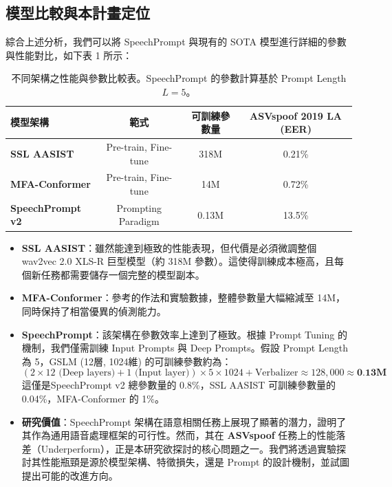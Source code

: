 \subsection{模型比較與本計畫定位}

綜合上述分析，我們可以將 SpeechPrompt 與現有的 SOTA 模型進行詳細的參數與性能對比，如下表 1 所示：

\begin{table}[H]
\centering
\caption{不同架構之性能與參數比較表。SpeechPrompt 的參數計算基於 Prompt Length $L=5$。}
\label{tab:model_comparison}
\begin{tabular}{lccc}
\toprule
\textbf{模型架構} & \textbf{範式 } & \textbf{可訓練參數量} & \textbf{ASVspoof 2019 LA (EER)} \\
\midrule
\textbf{SSL AASIST} & Pre-train, Fine-tune & 318M & 0.21\% \\
\textbf{MFA-Conformer} & Pre-train, Fine-tune & 14M & 0.72\% \\
\textbf{SpeechPrompt v2} & Prompting Paradigm & 0.13M & 13.5\% \\
\bottomrule
\end{tabular}
\end{table}

\begin{itemize}
    \item \textbf{SSL AASIST}：雖然能達到極致的性能表現，但代價是必須微調整個 wav2vec 2.0 XLS-R 巨型模型（約 318M 參數）。這使得訓練成本極高，且每個新任務都需要儲存一個完整的模型副本。
    \item \textbf{MFA-Conformer}：參考\cite{wang2023pretraining}的作法和實驗數據，整體參數量大幅縮減至 14M，同時保持了相當優異的偵測能力。
    \item \textbf{SpeechPrompt}：該架構在參數效率上達到了極致。根據 Prompt Tuning 的機制，我們僅需訓練 Input Prompts 與 Deep Prompts。假設 Prompt Length 為 5，GSLM (12層, 1024維) 的可訓練參數約為：
    \[ 
    (2 \times 12 \text{ (Deep layers)} + 1 \text{ (Input layer)}) \times 5 \times 1024 + \text{Verbalizer} \approx 128,000 \approx \textbf{0.13M}
    \]
    這僅是SpeechPrompt v2 總參數量的 0.8\%，SSL AASIST 可訓練參數量的 0.04\%，MFA-Conformer 的 1\%。
    \item \textbf{研究價值}：SpeechPrompt 架構在語意相關任務上展現了顯著的潛力，證明了其作為通用語音處理框架的可行性。然而，其在 \textbf{ASVspoof} 任務上的性能落差（Underperform），正是本研究欲探討的核心問題之一。我們將透過實驗探討其性能瓶頸是源於模型架構、特徵損失，還是 Prompt 的設計機制，並試圖提出可能的改進方向。
\end{itemize}

